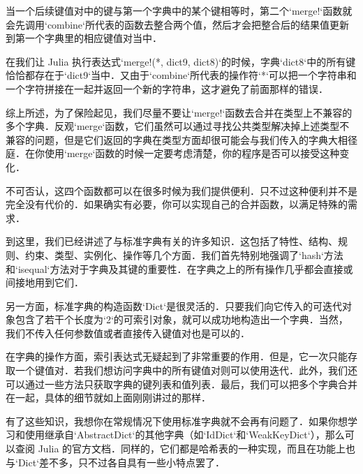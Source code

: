 当一个后续键值对中的键与第一个字典中的某个键相等时，第二个`merge!`函数就会先调用`combine`所代表的函数去整合两个值，然后才会把整合后的结果值更新到第一个字典里的相应键值对当中．

在我们让 Julia 执行表达式`merge!(*, dict9, dict8)`的时候，字典`dict8`中的所有键恰恰都存在于`dict9`当中．又由于`combine`所代表的操作符`*`可以把一个字符串和一个字符拼接在一起并返回一个新的字符串，这才避免了前面那样的错误．

综上所述，为了保险起见，我们尽量不要让`merge!`函数去合并在类型上不兼容的多个字典．反观`merge`函数，它们虽然可以通过寻找公共类型解决掉上述类型不兼容的问题，但是它们返回的字典在类型方面却很可能会与我们传入的字典大相径庭．在你使用`merge`函数的时候一定要考虑清楚，你的程序是否可以接受这种变化．

不可否认，这四个函数都可以在很多时候为我们提供便利．只不过这种便利并不是完全没有代价的．如果确实有必要，你可以实现自己的合并函数，以满足特殊的需求．

到这里，我们已经讲述了与标准字典有关的许多知识．这包括了特性、结构、规则、约束、类型、实例化、操作等几个方面．我们首先特别地强调了`hash`方法和`isequal`方法对于字典及其键的重要性．在字典之上的所有操作几乎都会直接或间接地用到它们．

另一方面，标准字典的构造函数`Dict`是很灵活的．只要我们向它传入的可迭代对象包含了若干个长度为`2`的可索引对象，就可以成功地构造出一个字典．当然，我们不传入任何参数值或者直接传入键值对也是可以的．

在字典的操作方面，索引表达式无疑起到了非常重要的作用．但是，它一次只能存取一个键值对．若我们想访问字典中的所有键值对则可以使用迭代．此外，我们还可以通过一些方法只获取字典的键列表和值列表．最后，我们可以把多个字典合并在一起，具体的细节就如上面刚刚讲过的那样．

有了这些知识，我想你在常规情况下使用标准字典就不会再有问题了．如果你想学习和使用继承自`AbstractDict`的其他字典（如`IdDict`和`WeakKeyDict`），那么可以查阅 Julia 的官方文档．同样的，它们都是哈希表的一种实现，而且在功能上也与`Dict`差不多，只不过各自具有一些小特点罢了．